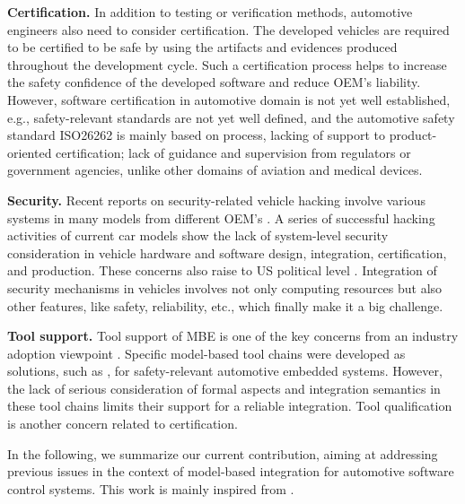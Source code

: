 \vspace{0.6em}
\textbf{Certification.}
In addition to testing or verification methods, automotive engineers also need to consider certification. The developed vehicles are required to be certified to be safe by using the artifacts and evidences produced throughout the development cycle. Such a certification process helps to increase the safety confidence of the developed software and reduce OEM's liability. However, software certification in automotive domain is not yet well established, e.g., safety-relevant standards are not yet well defined, and the automotive safety standard ISO26262 is mainly based on process, lacking of support to product-oriented certification; lack of guidance and supervision from regulators or government agencies, unlike other domains of aviation and medical devices.

\vspace{0.6em}
\textbf{Security.}
Recent reports on security-related vehicle hacking involve various systems in many models from different OEM's \cite{Schneider15} \cite{Harris2015}. A series of successful hacking activities of current car models show the lack of system-level security consideration in  vehicle hardware and software design, integration, certification, and production. These concerns also raise to US political level \cite{Markey15}. Integration of security mechanisms in vehicles involves not only computing resources but also other features, like safety, reliability, etc., which finally make it a big challenge.

\vspace{0.6em}
\textbf{Tool support.}
Tool support of MBE is one of the key concerns from an industry adoption viewpoint \cite{broy:2010-pieee}.  Specific model-based tool chains were developed as solutions, such as \cite{Armengaud11b}, for safety-relevant automotive embedded systems. However, the lack of serious consideration of formal aspects and integration semantics in these tool chains limits their support for a reliable integration. Tool qualification is another concern related to certification.



In the following, we summarize our current contribution, aiming at addressing previous issues in the context of model-based integration for automotive software control systems. This work is mainly inspired from \cite{yu:2013-jsa, ma13, feiler09, darpa-avm, sztipanovits:2012-pieee, broy:2010-pieee}.



